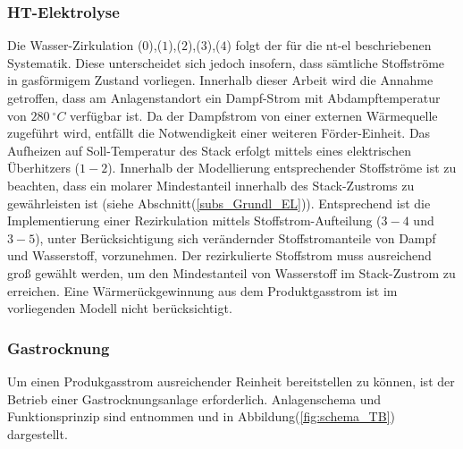 \documentclass[onecolumn,10pt,titlepage]{article}
\begin{document}
\subsubsection{HT-Elektrolyse}  
\label{subsubs_peri_schem_HT}
Die Wasser-Zirkulation ($0$),($1$),($2$),($3$),($4$) folgt der für die \gls{nt}-\gls{el} beschriebenen Systematik. Diese unterscheidet sich jedoch insofern, dass sämtliche Stoffströme in gasförmigem Zustand vorliegen. Innerhalb dieser Arbeit wird die Annahme getroffen, dass am Anlagenstandort ein Dampf-Strom mit Abdampftemperatur von $280~^\circ C$ verfügbar ist. Da der Dampfstrom von einer externen Wärmequelle zugeführt wird, entfällt die Notwendigkeit einer weiteren Förder-Einheit. Das Aufheizen auf Soll-Temperatur des Stack erfolgt mittels eines elektrischen Überhitzers ($1-2$). Innerhalb der Modellierung entsprechender Stoffströme ist zu beachten, dass ein molarer Mindestanteil innerhalb des Stack-Zustroms zu gewährleisten ist (siehe Abschnitt(\ref{subs_Grundl_EL})). Entsprechend ist die Implementierung einer Rezirkulation mittels Stoffstrom-Aufteilung ($3-4$ und $3-5$), unter Berücksichtigung sich verändernder Stoffstromanteile von Dampf und Wasserstoff, vorzunehmen. Der rezirkulierte Stoffstrom muss ausreichend groß gewählt werden, um den Mindestanteil von Wasserstoff im Stack-Zustrom zu erreichen. Eine Wärmerückgewinnung aus dem Produktgasstrom ist im vorliegenden Modell nicht berücksichtigt.

\subsubsection{Gastrocknung}
\label{subsubs_peri_schem_Gastrockn}
Um einen Produkgasstrom ausreichender Reinheit bereitstellen zu können, ist der Betrieb einer Gastrocknungsanlage erforderlich. Anlagenschema und Funktionsprinzip sind \cite{Tjarks2017} entnommen und in Abbildung(\ref {fig:schema_TB}) dargestellt.
\end{document}
